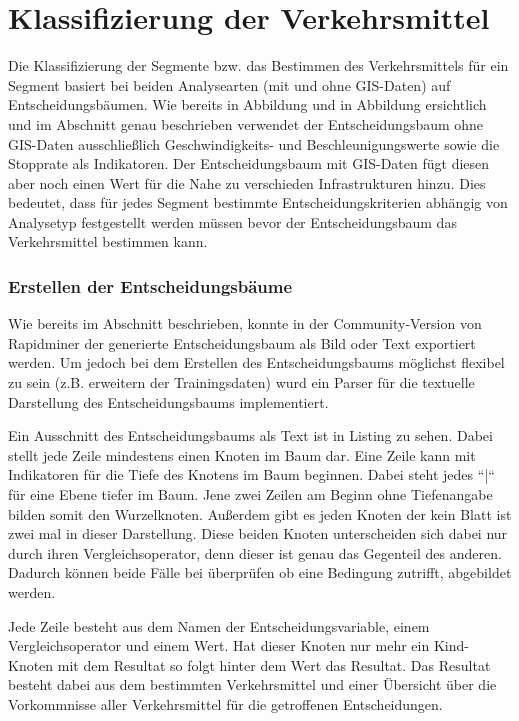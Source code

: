 \section{Klassifizierung der Verkehrsmittel}
Die Klassifizierung der Segmente bzw. das Bestimmen des Verkehrsmittels für ein Segment basiert bei beiden Analysearten (mit und ohne GIS-Daten) auf Entscheidungsbäumen. Wie bereits in Abbildung  und in Abbildung  ersichtlich und im Abschnitt  genau beschrieben verwendet der Entscheidungsbaum ohne GIS-Daten ausschließlich Geschwindigkeits- und Beschleunigungswerte sowie die Stopprate als Indikatoren. Der Entscheidungsbaum mit GIS-Daten fügt diesen aber noch einen Wert für die Nahe zu verschieden Infrastrukturen hinzu. Dies bedeutet, dass für jedes Segment bestimmte Entscheidungskriterien abhängig von Analysetyp festgestellt werden müssen bevor der Entscheidungsbaum das Verkehrsmittel bestimmen kann. 

\subsubsection{Erstellen der Entscheidungsbäume}
\label{entscheidungsbaumGenerierungPHP}
Wie bereits im Abschnitt  beschrieben, konnte in der Community-Version von Rapidminer der generierte Entscheidungsbaum als Bild oder Text exportiert werden. Um jedoch bei dem Erstellen des Entscheidungsbaums möglichst flexibel zu sein (z.B. erweitern der Trainingsdaten) wurd ein Parser für die textuelle Darstellung des Entscheidungsbaums implementiert. 

Ein Ausschnitt des Entscheidungsbaums als Text ist in Listing  zu sehen. Dabei stellt jede Zeile mindestens einen Knoten im Baum dar. Eine Zeile kann mit Indikatoren für die Tiefe des Knotens im Baum beginnen. Dabei steht jedes ``|`` für eine Ebene tiefer im Baum. Jene zwei Zeilen am Beginn ohne Tiefenangabe bilden somit den Wurzelknoten. Außerdem gibt es jeden Knoten der kein Blatt ist zwei mal in dieser Darstellung. Diese beiden Knoten unterscheiden sich dabei nur durch ihren Vergleichsoperator, denn dieser ist genau das Gegenteil des anderen. Dadurch können beide Fälle bei überprüfen ob eine Bedingung zutrifft, abgebildet werden.

Jede Zeile besteht aus dem Namen der Entscheidungsvariable, einem Vergleichsoperator und einem Wert. Hat dieser Knoten nur mehr ein Kind-Knoten mit dem Resultat so folgt hinter dem Wert das Resultat. Das Resultat besteht dabei aus dem bestimmten Verkehrsmittel und einer Übersicht über die Vorkommnisse aller Verkehrsmittel für die getroffenen Entscheidungen.

